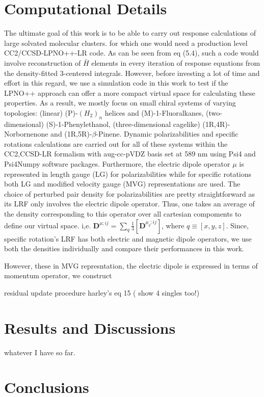 \section{Computational Details}
The ultimate goal of this work is to be able to carry out response calculations of large solvated molecular clusters.
for which one would need a production level CC2/CCSD-LPNO++-LR code. As can be seen from eq (5.4), such a code would
involve reconstruction of $\bar{H}$ elements in every iteration of response equations from the density-fitted 
3-centered integrals. However, before investing a lot of time and effort in this regard, we use a simulation code in 
this work to test if the LPNO++ approach can offer a more compact virtual space for calculating these properties. 
As a result, we mostly focus on small chiral systems of varying topologies: (linear) (P)-$(H_2)_n$ helices and (M)-1-Fluoralkanes, 
(two-dimensional) (S)-1-Phenylethanol, (three-dimensional cagelike) (1R,4R)-Norbornenone and (1R,5R)-$\beta$-Pinene. 
Dynamic polarizabilities and specific rotations calculations are carried out for all of these systems within the CC2,CCSD-LR
formalism with aug-cc-pVDZ\cite{} basis set at 589 nm using Psi4 and Psi4Numpy software packages\cite{}.
Furthermore, the electric dipole operator $\mu$ is represented in length gauge (LG) for polarizabilities
while for specific rotations both LG and modified velocity gauge (MVG)\cite{} representations are used.
The choice of perturbed pair density for polarizabilities are pretty straightforward as its LRF only involves 
the electric dipole operator. Thus, one takes an average of the density corresponding to this operator over all cartesian 
compoments to define our virtual space. i,e. $ {\bm{D}^{\mu;ij}} = \sum\limits_q \frac{1}{3}[{\bm{D}^{\mu_q;ij}}]$,
where $q \equiv [x,y,z]$. Since, specific rotation's LRF has both electric and magnetic dipole operators, we use 
both the densities individually and compare their performances in this work. 


However, these in MVG represntation, the electric dipole is expressed in terms of momentum operator, we construct  

 
residual update procedure
harley's eq 15 ( show 4 singles too!)
\section{Results and Discussions}
whatever I have so far.
\section{Conclusions}

